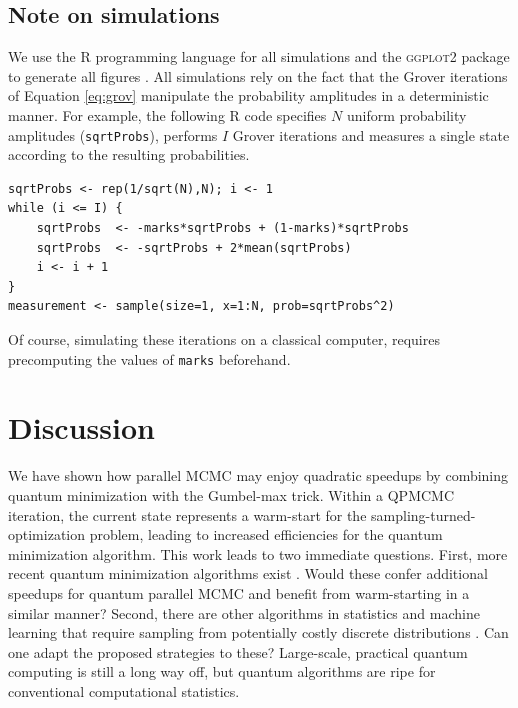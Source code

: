 \documentclass[12pt]{article} %
\begin{document}
\subsection{Note on simulations}

We use the \textsc{R} programming language \citep{rlang} for all simulations and the \textsc{ggplot2} package to generate all figures \citep{ggplot}.  All simulations rely on the fact that the Grover iterations of Equation \eqref{eq:grov} manipulate the probability amplitudes in a deterministic manner. For example, the following \textsc{R} code specifies $N$ uniform probability amplitudes (\verb|sqrtProbs|), performs $I$ Grover iterations and measures a single state according to the resulting probabilities.
\begin{verbatim}
sqrtProbs <- rep(1/sqrt(N),N); i <- 1
while (i <= I) {
	sqrtProbs  <- -marks*sqrtProbs + (1-marks)*sqrtProbs
	sqrtProbs  <- -sqrtProbs + 2*mean(sqrtProbs)
	i <- i + 1
}
measurement <- sample(size=1, x=1:N, prob=sqrtProbs^2)
\end{verbatim}
Of course, simulating these iterations on a classical computer, requires precomputing the values of \verb|marks| beforehand.

\section{Discussion}

We have shown how parallel MCMC may enjoy quadratic speedups by combining quantum minimization with the Gumbel-max trick.  Within a QPMCMC iteration, the current state represents a warm-start for the sampling-turned-optimization problem, leading to increased efficiencies for the quantum minimization algorithm.  This work leads to two immediate questions.  First, more recent quantum minimization algorithms exist \citep{baritompa2005grover,farhi2014quantum}.  Would these confer additional speedups for quantum parallel MCMC and benefit from warm-starting in a similar manner? Second, there are other algorithms in statistics and machine learning that require sampling from potentially costly discrete distributions \citep{liu2001theoretical,csillery2010approximate}.  Can one adapt  the proposed strategies to these?  Large-scale, practical quantum computing is still a long way off, but quantum algorithms are ripe for conventional computational statistics.




\appendix




\end{document}
